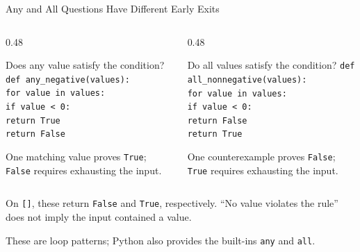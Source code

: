 \documentclass[aspectratio=169,10pt]{beamer}
\begin{document}
\begin{frame}{Any and All Questions Have Different Early Exits}
  \small
  \begin{columns}[T,onlytextwidth]
    \begin{column}{0.48\textwidth}
      \begin{block}{Does any value satisfy the condition?}
        \texttt{def any\_negative(values):}\\
        \hspace{0.16in}\texttt{for value in values:}\\
        \hspace{0.32in}\texttt{if value < 0:}\\
        \hspace{0.48in}\texttt{return True}\\
        \hspace{0.16in}\texttt{return False}
      \end{block}
      One matching value proves \texttt{True}; \texttt{False} requires exhausting the input.
    \end{column}
    \begin{column}{0.48\textwidth}
      \begin{block}{Do all values satisfy the condition?}
        \texttt{def all\_nonnegative(values):}\\
        \hspace{0.16in}\texttt{for value in values:}\\
        \hspace{0.32in}\texttt{if value < 0:}\\
        \hspace{0.48in}\texttt{return False}\\
        \hspace{0.16in}\texttt{return True}
      \end{block}
      One counterexample proves \texttt{False}; \texttt{True} requires exhausting the input.
    \end{column}
  \end{columns}
  \begin{keyidea}
    On \texttt{[]}, these return \texttt{False} and \texttt{True}, respectively. ``No value violates the rule'' does not imply the input contained a value.
  \end{keyidea}
  These are loop patterns; Python also provides the built-ins \texttt{any} and \texttt{all}.
\end{frame}
\end{document}
